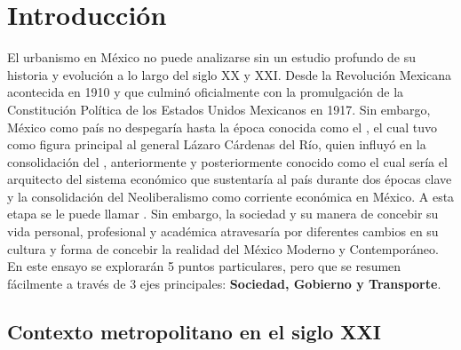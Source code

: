 
\section{Introducción}
\label{sec:introduccion}

El urbanismo en México no puede analizarse sin un estudio profundo de su historia y evolución a lo largo del siglo XX
y XXI. Desde la Revolución Mexicana acontecida en 1910 y que culminó oficialmente con la promulgación de la Constitución
Política de los Estados Unidos Mexicanos en 1917. Sin embargo, México como país no despegaría hasta
la época conocida como el , el cual tuvo como figura principal al general Lázaro Cárdenas del Río, quien
influyó en la consolidación del , anteriormente 
y posteriormente conocido como  el cual sería el arquitecto del sistema económico 
que sustentaría al país durante dos épocas clave  y la consolidación del Neoliberalismo como corriente
económica en México. A esta etapa se le puede llamar  \cite{vargasllosa_dictadura}. Sin embargo, la sociedad y su manera 
de concebir su vida personal, profesional y académica atravesaría por diferentes cambios en su cultura y forma de concebir la realidad 
del México Moderno y Contemporáneo. En este ensayo se explorarán 5 puntos particulares, pero que se resumen fácilmente a través de 3 ejes
principales: \textbf{Sociedad, Gobierno y Transporte}.


\subsection{Contexto metropolitano en el siglo XXI}
\label{ssec:contexto-metropolitano}

